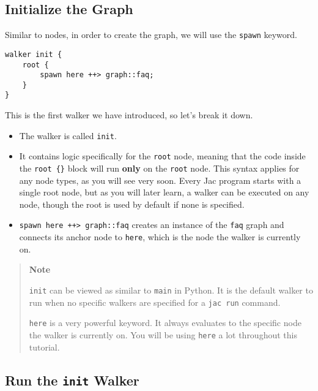 \hypertarget{initialize-the-graph}{%
\subsection{Initialize the Graph}\label{initialize-the-graph}}

Similar to nodes, in order to create the graph, we will use the
\passthrough{\lstinline!spawn!} keyword.

\begin{lstlisting}
walker init {
    root {
        spawn here ++> graph::faq;
    }
}
\end{lstlisting}

This is the first walker we have introduced, so let's break it down.

\begin{itemize}
\tightlist
\item
  The walker is called \passthrough{\lstinline!init!}.
\item
  It contains logic specifically for the \passthrough{\lstinline!root!}
  node, meaning that the code inside the
  \passthrough{\lstinline!root \{\}!} block will run \textbf{only} on
  the \passthrough{\lstinline!root!} node. This syntax applies for any
  node types, as you will see very soon. Every Jac program starts with a
  single root node, but as you will later learn, a walker can be
  executed on any node, though the root is used by default if none is
  specified.
\item
  \passthrough{\lstinline!spawn here ++> graph::faq!} creates an
  instance of the \passthrough{\lstinline!faq!} graph and connects its
  anchor node to \passthrough{\lstinline!here!}, which is the node the
  walker is currently on.
\end{itemize}

\begin{quote}
\textbf{Note}

\passthrough{\lstinline!init!} can be viewed as similar to
\passthrough{\lstinline!main!} in Python. It is the default walker to
run when no specific walkers are specified for a
\passthrough{\lstinline!jac run!} command.

\passthrough{\lstinline!here!} is a very powerful keyword. It always
evaluates to the specific node the walker is currently on. You will be
using \passthrough{\lstinline!here!} a lot throughout this tutorial.
\end{quote}

\hypertarget{run-the-init-walker}{%
\subsection{\texorpdfstring{Run the \texttt{init}
Walker}{Run the init Walker}}\label{run-the-init-walker}}

